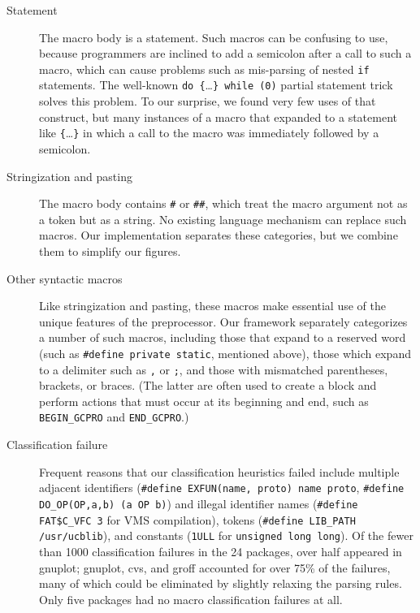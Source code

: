 \documentclass[11pt]{article}
\begin{document}
\begin{description}

\item[Statement]  The macro body is a statement.  Such macros can be
  confusing to use, because programmers are inclined to add a semicolon
  after a call to such a macro, which can cause problems such as 
  mis-parsing of nested {\tt if} statements.  The
  well-known \verb|do {|\ldots\verb|} while (0)| partial statement trick
  solves this problem.  To our surprise, we found very few uses of that
  construct, but many instances of a macro that expanded to a statement
  like \verb|{|\ldots\verb|}| in which a call to the macro was immediately
  followed by a semicolon.

\item[Stringization and pasting]  The macro body contains {\tt \#} or
  {\tt \#\#}, which treat the macro argument not as a token but as a
  string.  No existing language mechanism can replace such macros.  Our
  implementation separates these categories, but we combine them to
  simplify our figures.

\item[Other syntactic macros]  Like stringization and pasting, these
  macros make essential use of the unique features of the preprocessor.
  Our framework separately categorizes a number of such macros, including
  those that expand to a reserved word (such as {\tt \#define private
  static}, mentioned above), those which expand to a delimiter such as
  {\tt ,} or {\tt ;}, and those with mismatched parentheses, brackets, or
  braces.  (The latter are often used to create a block and perform actions
  that must occur at its beginning and end, such as \verb|BEGIN_GCPRO| and
  \verb|END_GCPRO|.)

\item[Classification failure]  Frequent reasons that our
classification heuristics failed
  include multiple adjacent identifiers
  ({\tt \#define EXFUN(name, proto) name proto},
  {\tt \#define \verb|DO_OP|(OP,a,b) (a OP b)}) and illegal identifier
  names ({\tt \#define \verb|FAT$C_VFC| 3} for VMS compilation), tokens
  ({\tt \#define \verb|LIB_PATH| /usr/ucblib}), and constants ({\tt 1ULL} for
  {\tt unsigned long long}).  Of the fewer than 1000 classification
  failures in the 24 packages, over half appeared in gnuplot; gnuplot, cvs,
  and groff accounted for over 75\% of the failures, many of which could be
  eliminated by slightly relaxing the parsing rules.  Only five packages had no
  macro classification failures at all.



\end{description}
\end{document}
